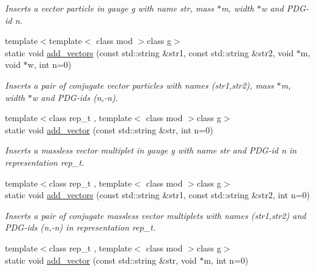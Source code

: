 \begin{DoxyCompactItemize}
\begin{DoxyCompactList}\small\item\em Inserts a vector particle in gauge g with name str, mass $\ast$m, width $\ast$w and P\+D\+G-\/id n. \end{DoxyCompactList}\item 
\hypertarget{a00372_ad261293fcd85128d9d06ad33c84192dc}{}{\footnotesize template$<$template$<$ class mod $>$class g$>$ }\\static void \hyperlink{a00372_ad261293fcd85128d9d06ad33c84192dc}{add\+\_\+vectors} (const std\+::string \&str1, const std\+::string \&str2, void $\ast$m, void $\ast$w, int n=0)\label{a00372_ad261293fcd85128d9d06ad33c84192dc}

\begin{DoxyCompactList}\small\item\em Inserts a pair of conjugate vector particles with names (str1,str2), mass $\ast$m, width $\ast$w and P\+D\+G-\/ids (n,-\/n). \end{DoxyCompactList}\item 
\hypertarget{a00372_a984fc6fde4897b248426d472714305e5}{}{\footnotesize template$<$class rep\+\_\+t , template$<$ class mod $>$class g$>$ }\\static void \hyperlink{a00372_a984fc6fde4897b248426d472714305e5}{add\+\_\+vector} (const std\+::string \&str, int n=0)\label{a00372_a984fc6fde4897b248426d472714305e5}

\begin{DoxyCompactList}\small\item\em Inserts a massless vector multiplet in gauge g with name str and P\+D\+G-\/id n in representation rep\+\_\+t. \end{DoxyCompactList}\item 
\hypertarget{a00372_a86ae07ca89c421c6d143e88a1922a1a3}{}{\footnotesize template$<$class rep\+\_\+t , template$<$ class mod $>$class g$>$ }\\static void \hyperlink{a00372_a86ae07ca89c421c6d143e88a1922a1a3}{add\+\_\+vectors} (const std\+::string \&str1, const std\+::string \&str2, int n=0)\label{a00372_a86ae07ca89c421c6d143e88a1922a1a3}

\begin{DoxyCompactList}\small\item\em Inserts a pair of conjugate massless vector multiplets with names (str1,str2) and P\+D\+G-\/ids (n,-\/n) in representation rep\+\_\+t. \end{DoxyCompactList}\item 
\hypertarget{a00372_ae7334993355db2d1df194f83680d6292}{}{\footnotesize template$<$class rep\+\_\+t , template$<$ class mod $>$class g$>$ }\\static void \hyperlink{a00372_ae7334993355db2d1df194f83680d6292}{add\+\_\+vector} (const std\+::string \&str, void $\ast$m, int n=0)\label{a00372_ae7334993355db2d1df194f83680d6292}


\end{DoxyCompactItemize}
